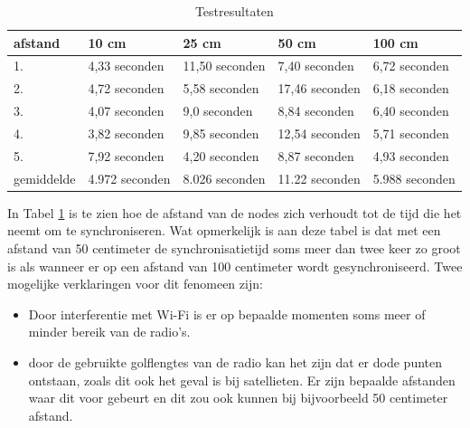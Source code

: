 \documentclass{article}
\begin{document}
\begin{table}[h]
	\centering\caption{Testresultaten}
	\label{tab: testresultaten}
    \begin{tabular}{| l | l | l | l |  l |}\hline
    \textbf{afstand } & \textbf{10 cm } & \textbf{25 cm} & \textbf{50 cm} & \textbf{100 cm} \\ \hline\hline
   1. & 4,33 seconden & 11,50 seconden& 7,40 seconden& 6,72 seconden\\ \hline
    2. & 4,72 seconden & 5,58 seconden& 17,46 seconden& 6,18 seconden\\ \hline
    3. & 4,07 seconden & 9,0 seconden& 8,84 seconden& 6,40 seconden\\ \hline
    4. & 3,82 seconden & 9,85 seconden& 12,54 seconden& 5,71 seconden\\ \hline
    5. & 7,92 seconden & 4,20 seconden& 8,87 seconden& 4,93 seconden\\ \hline \hline
   gemiddelde & 4.972 seconden & 8.026 seconden& 11.22 seconden& 5.988 seconden\\\hline
    \end{tabular}
\end{table}
In Tabel \ref{tab: testresultaten} is te zien hoe de afstand van de nodes zich verhoudt tot de tijd die het neemt om te synchroniseren. Wat opmerkelijk is aan deze tabel is dat met een afstand van 50 centimeter de synchronisatietijd soms meer dan twee keer zo groot is als wanneer er op een afstand van 100 centimeter wordt gesynchroniseerd. Twee mogelijke verklaringen voor dit fenomeen zijn:
\begin{itemize}
	\item Door interferentie met Wi-Fi is er op bepaalde momenten soms meer of minder bereik van de radio's.
	\item door de gebruikte golflengtes van de radio kan het zijn dat er dode punten ontstaan, zoals dit ook het geval is bij satellieten. Er zijn bepaalde afstanden waar dit voor gebeurt en dit zou ook kunnen bij bijvoorbeeld 50 centimeter afstand. 
\end{itemize}
\end{document}
